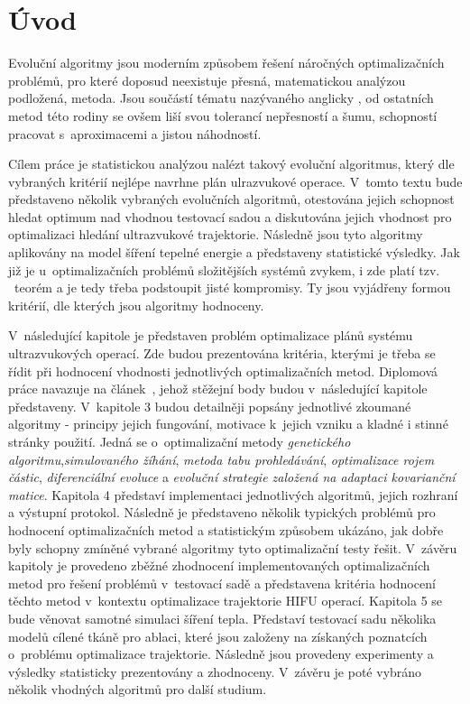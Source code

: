 \chapter{Úvod}
\label{intro}
Evoluční algoritmy jsou moderním způsobem řešení náročných optimalizačních problémů, pro které doposud neexistuje přesná, matematickou analýzou podložená, metoda. Jsou součástí tématu nazývaného anglicky , od ostatních metod této rodiny se ovšem liší svou tolerancí nepřesností a šumu, schopností pracovat s~aproximacemi a jistou náhodností.

Cílem práce je statistickou analýzou nalézt takový evoluční algoritmus, který dle vybraných kritérií nejlépe navrhne plán ulrazvukové operace. V~tomto textu bude představeno několik vybraných evolučních algoritmů, otestována jejich schopnost hledat optimum nad vhodnou testovací sadou a diskutována jejich vhodnost pro optimalizaci hledání ultrazvukové trajektorie. Následně jsou tyto algoritmy aplikovány na model šíření tepelné energie a představeny statistické výsledky.  Jak již je u~optimalizačních problémů složitějších systémů zvykem, i zde platí tzv. ~teorém a je tedy třeba podstoupit jisté kompromisy. Ty jsou vyjádřeny formou kritérií, dle kterých jsou algoritmy hodnoceny.

V~následující kapitole je představen problém optimalizace plánů systému ultrazvukových operací. Zde budou prezentována kritéria, kterými je třeba se řídit při hodnocení vhodnosti jednotlivých optimalizačních metod. Diplomová práce navazuje na článek~\cite{FITPUB11696}, jehož stěžejní body budou v~následující kapitole představeny. V~kapitole 3 budou detailněji popsány jednotlivé zkoumané algoritmy - principy jejich fungování, motivace k~jejich vzniku a kladné i stinné stránky použití. Jedná se o~optimalizační metody \textit{genetického algoritmu},\textit{simulovaného žíhání}, \textit{metoda tabu prohledávání}, \textit{optimalizace rojem částic}, \textit{diferenciální evoluce} a \textit{evoluční strategie založená na adaptaci kovarianční matice}. Kapitola 4 představí implementaci jednotlivých algoritmů, jejich rozhraní a výstupní protokol. Následně je představeno několik typických problémů pro hodnocení optimalizačních metod a statistickým způsobem ukázáno, jak dobře byly schopny zmíněné vybrané algoritmy tyto optimalizační testy řešit. V~závěru kapitoly je provedeno zběžné zhodnocení implementovaných optimalizačních metod pro řešení problémů v~testovací sadě a představena kritéria hodnocení těchto metod v~kontextu optimalizace trajektorie HIFU operací. Kapitola 5 se bude věnovat samotné simulaci šíření tepla. Představí testovací sadu několika modelů cílené tkáně pro ablaci, které jsou založeny na získaných poznatcích o~problému optimalizace trajektorie. Následně jsou provedeny experimenty a výsledky statisticky prezentovány a zhodnoceny. V~závěru je poté vybráno několik vhodných algoritmů pro další studium.

